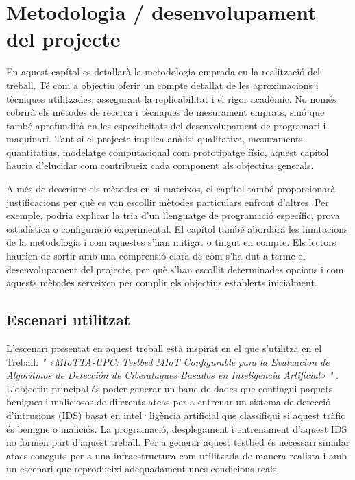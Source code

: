

\chapter{Metodologia / desenvolupament del projecte}
  
  En aquest capítol es detallarà la metodologia emprada en la realització del treball. Té com a objectiu oferir un compte detallat de les aproximacions i tècniques utilitzades, assegurant la replicabilitat i el rigor acadèmic. No només cobrirà els mètodes de recerca i tècniques de mesurament emprats, sinó que també aprofundirà en les especificitats del desenvolupament de programari i maquinari. Tant si el projecte implica anàlisi qualitativa, mesuraments quantitatius, modelatge computacional com prototipatge físic, aquest capítol hauria d'elucidar com contribueix cada component als objectius generals.
  
  A més de descriure els mètodes en si mateixos, el capítol també proporcionarà justificacions per què es van escollir mètodes particulars enfront d'altres. Per exemple, podria explicar la tria d'un llenguatge de programació específic, prova estadística o configuració experimental. El capítol també abordarà les limitacions de la metodologia i com aquestes s'han mitigat o tingut en compte. Els lectors haurien de sortir amb una comprensió clara de com s'ha dut a terme el desenvolupament del projecte, per què s'han escollit determinades opcions i com aquests mètodes serveixen per complir els objectius establerts inicialment.

\section{Escenari utilitzat}

  L’escenari presentat en aquest treball està inspirat en el que s'utilitza en el Treball: \textit{" «MIoTTA-UPC: Testbed MIoT Configurable para la Evaluacion de Algoritmos de Detección de Ciberataques Basados en Inteligencia Artificial» "} \cite{miottaupcfig} . L’objectiu principal és poder generar un banc de dades que contingui paquets benignes i maliciosos de diferents atcas per a entrenar un sistema de detecció d’intrusions (IDS) basat en intel·ligència artificial que classifiqui si aquest tràfic és benigne o maliciós. La programació, desplegament i entrenament d’aquest IDS no formen part d’aquest treball. Per a generar aquest testbed és necessari simular atacs coneguts per a una infraestructura com utilitzada de manera realista i amb un escenari que reprodueixi adequadament unes condicions reals.

